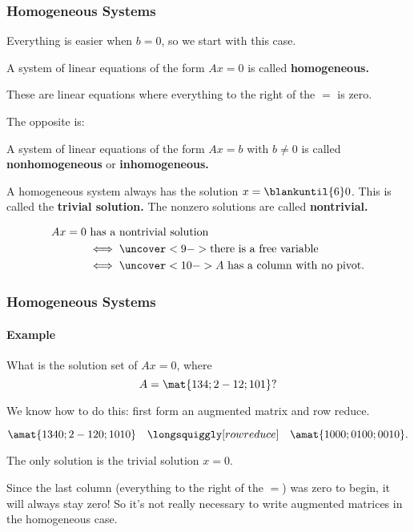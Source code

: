 \begin{frame}
\frametitle{Homogeneous Systems}
Everything is easier when $b=0$, so we start with this case.

\pause
\begin{defn}
  A system of linear equations of the form $Ax=0$ is called
  \textbf{homogeneous.}
\end{defn}

\pause\smallskip
These are linear equations where everything to the right of the $=$ is zero.

\pause
The opposite is:

\begin{defn}
  A system of linear equations of the form $Ax=b$ with $b\neq 0$ is called
  \textbf{nonhomogeneous} or \textbf{inhomogeneous.}
\end{defn}

\pause\smallskip
A homogeneous system always has the solution $x=\blankuntil{6}0$.
\pause[6]
This is called the \textbf{trivial solution.}
\pause
The nonzero solutions are called \textbf{nontrivial.}

\pause\smallskip
\begin{bluebox}[Observation]{.6\textwidth}
  \abovedisplayskip=0pt \abovedisplayshortskip=0pt
  \[\begin{split}
    Ax=0 &\text{ has a nontrivial solution} \\
    &\iff \uncover<9->{ \text{there is a free variable}} \\
    &\iff \uncover<10->{ \text{$A$ has a column with no pivot.}}
  \end{split}\]

\end{bluebox}

\end{frame}



\begin{frame}
\frametitle{Homogeneous Systems}
\framesubtitle{Example}

\vskip-3mm
\begin{ques}
  What is the solution set of $Ax=0$, where
  \[ A = \mat{1 3 4; 2 -1 2; 1 0 1}? \]
\end{ques}

\pause
We know how to do this: first form an augmented matrix and row reduce.
\begin{webonly}
\[ \amat{1 3 4 0; 2 -1 2 0; 1 0 1 0}
\quad\longsquiggly[row reduce]\quad
\amat{1 0 0 0; 0 1 0 0; 0 0 1 0}. \]
\end{webonly}
\pause
The only solution is the trivial solution $x=0$.

\pause
\begin{bluebox}[Observation]{.8\textwidth}
  Since the last column (everything to the right of the $=$) was zero to begin,
  it will always stay zero! \pause
  So it's not really necessary to write augmented matrices in the homogeneous case.
\end{bluebox}

\end{frame}


